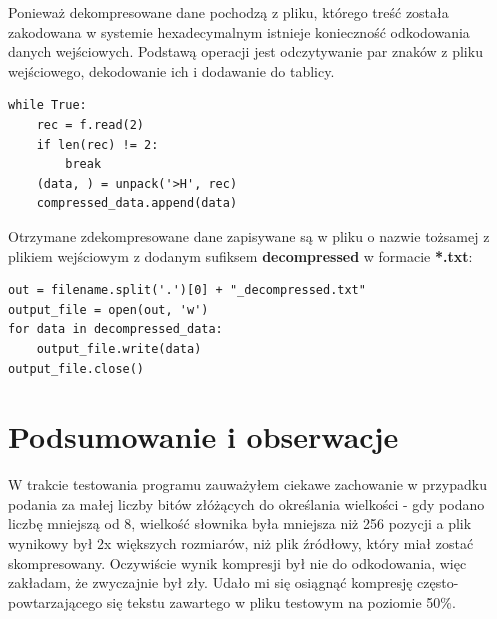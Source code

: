 \documentclass[12pt, a4paper]{article}
\begin{document}
Ponieważ dekompresowane dane pochodzą z pliku, którego treść została zakodowana w systemie hexadecymalnym istnieje konieczność odkodowania danych wejściowych. Podstawą operacji jest odczytywanie par znaków z pliku wejściowego, dekodowanie ich i dodawanie do tablicy.
\begin{verbatim}
while True:
    rec = f.read(2)
    if len(rec) != 2:
        break
    (data, ) = unpack('>H', rec)
    compressed_data.append(data)
\end{verbatim}

Otrzymane zdekompresowane dane zapisywane są w pliku o nazwie tożsamej z plikiem wejściowym z dodanym sufiksem \textbf{decompressed} w formacie \textbf{*.txt}:
\begin{verbatim}
out = filename.split('.')[0] + "_decompressed.txt"
output_file = open(out, 'w')
for data in decompressed_data:
    output_file.write(data)
output_file.close()

\end{verbatim}

\section{Podsumowanie i obserwacje}
W trakcie testowania programu zauważyłem ciekawe zachowanie w przypadku podania za małej liczby bitów złóżących do określania wielkości - gdy podano liczbę mniejszą od 8, wielkość słownika była mniejsza niż 256 pozycji a plik wynikowy był 2x większych rozmiarów, niż plik źródłowy, który miał zostać skompresowany. Oczywiście wynik kompresji był nie do odkodowania, więc zakładam, że zwyczajnie był zły.
Udało mi się osiągnąć kompresję często-powtarzającego się tekstu zawartego w pliku testowym na poziomie 50\%.
\end{document}
